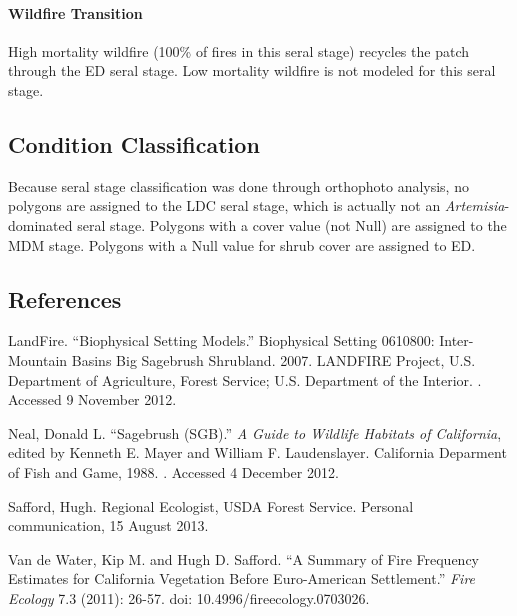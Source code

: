 \paragraph*{Wildfire Transition} High mortality wildfire (100\% of fires in this seral stage) recycles the patch through the ED seral stage. Low mortality wildfire is not modeled for this seral stage.

\noindent\hrulefill

\subsection*{Condition Classification}
Because seral stage classification was done through orthophoto analysis, no polygons are assigned to the LDC seral stage, which is actually not an \emph{Artemisia}-dominated seral stage. Polygons with a cover value (not Null) are assigned to the MDM stage. Polygons with a Null value for shrub cover are assigned to ED.



\subsection*{References}

\begin{hangparas}{.25in}{1} 
LandFire. ``Biophysical Setting Models.'' Biophysical Setting 0610800: Inter-Mountain Basins Big Sagebrush Shrubland. 2007. LANDFIRE Project, U.S. Department of Agriculture, Forest Service; U.S. Department of the Interior. . Accessed 9 November 2012.

Neal, Donald L. ``Sagebrush (SGB).'' \emph{A Guide to Wildlife Habitats of California}, edited by Kenneth E. Mayer and William F. Laudenslayer. California Deparment of Fish and Game, 1988. . Accessed 4 December 2012.

Safford, Hugh. Regional Ecologist, USDA Forest Service. Personal communication, 15 August 2013.

Van de Water, Kip M. and Hugh D. Safford. ``A Summary of Fire Frequency Estimates for California Vegetation Before Euro-American Settlement.'' \emph{Fire Ecology} 7.3 (2011): 26-57. doi: 10.4996/fireecology.0703026.
\end{hangparas}

